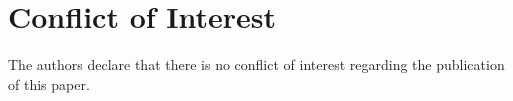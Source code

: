\documentclass[11pt]{article}
\begin{document}
\section*{Conflict of Interest}
\label{section:Conflict}

The authors declare that there is no conflict of interest regarding the publication of this paper.





\end{document}
